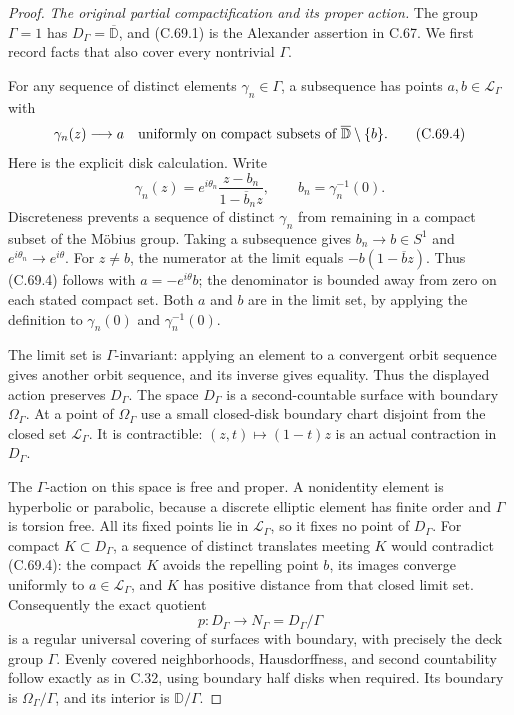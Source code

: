 \begin{proof}
\emph{The original partial compactification and its proper action.}
The group $\Gamma=1$ has
$D_\Gamma=\overline{\mathbb D}$, and (C.69.1)
is the Alexander assertion in C.67.
We first record facts that also cover every
nontrivial $\Gamma$.

For any sequence of distinct elements
$\gamma_n\in\Gamma$, a subsequence has points
$a,b\in\mathcal L_\Gamma$ with
\[
 \gamma_n(z)\longrightarrow a
 \quad\hbox{uniformly on compact subsets of }
                        \overline{\mathbb D}\setminus\{b\}.
                                                               \tag{C.69.4}
\]
Here is the explicit disk calculation.
Write
\[
 \gamma_n(z)=e^{i\theta_n}
                  \frac{z-b_n}{1-\overline b_n z},
                    \qquad b_n=\gamma_n^{-1}(0).
                                                               \tag{C.69.5}
\]
Discreteness prevents a sequence of distinct
$\gamma_n$ from remaining in a compact subset
of the M\"obius group. Taking a subsequence
gives $b_n\to b\in S^1$ and
$e^{i\theta_n}\to e^{i\theta}$.
For $z\ne b$, the numerator at the limit
equals $-b(1-\overline b z)$.
Thus (C.69.4) follows with
$a=-e^{i\theta}b$; the denominator is bounded
away from zero on each stated compact set.
Both $a$ and $b$ are in the limit set,
by applying the definition to
$\gamma_n(0)$ and $\gamma_n^{-1}(0)$.

The limit set is $\Gamma$-invariant: applying
an element to a convergent orbit sequence
gives another orbit sequence, and its
inverse gives equality. Thus the displayed
action preserves $D_\Gamma$.
The space $D_\Gamma$ is a second-countable
surface with boundary $\Omega_\Gamma$.
At a point of $\Omega_\Gamma$ use a small
closed-disk boundary chart disjoint from
the closed set $\mathcal L_\Gamma$.
It is contractible: $(z,t)\mapsto(1-t)z$
is an actual contraction in $D_\Gamma$.

The $\Gamma$-action on this space is free
and proper. A nonidentity element is
hyperbolic or parabolic, because a discrete
elliptic element has finite order and
$\Gamma$ is torsion free. All its fixed
points lie in $\mathcal L_\Gamma$, so
it fixes no point of $D_\Gamma$.
For compact $K\subset D_\Gamma$, a sequence
of distinct translates meeting $K$
would contradict (C.69.4): the compact
$K$ avoids the repelling point $b$,
its images converge uniformly to
$a\in\mathcal L_\Gamma$, and $K$ has
positive distance from that closed
limit set. Consequently the exact quotient
\[
                p:D_\Gamma\longrightarrow
                           N_\Gamma=D_\Gamma/\Gamma
                                                               \tag{C.69.6}
\]
is a regular universal covering of
surfaces with boundary, with precisely
the deck group $\Gamma$.
Evenly covered neighborhoods, Hausdorffness,
and second countability follow exactly
as in C.32, using boundary half disks
when required. Its boundary is
$\Omega_\Gamma/\Gamma$, and its interior
is $\mathbb D/\Gamma$.


\end{proof}
